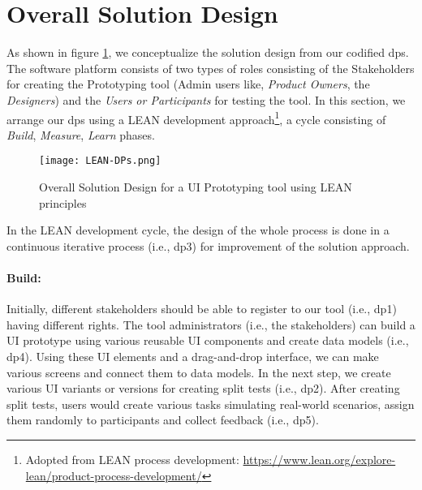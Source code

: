 
\clearpage
\section{Overall Solution Design}
\label{design:section:solutiondesign}
As shown in figure \ref{fig:design:lean}, we conceptualize the solution design from our codified \ac{dp}s.
The software platform consists of two types of roles consisting of the Stakeholders for creating the Prototyping tool (Admin users like, \textit{Product Owners}, the \textit{Designers}) and the \textit{Users or Participants} for testing the tool.
In this section, we arrange our \ac{dp}s using a LEAN development approach\footnote{Adopted from LEAN process development: \url{https://www.lean.org/explore-lean/product-process-development/}}, a cycle consisting of \textit{Build}, \textit{Measure}, \textit{Learn} phases.

\begin{figure}[htbp!]
  \centering    
  \texttt{[image: LEAN-DPs.png]}
  \caption[Solution Concept]{Overall Solution Design for a UI Prototyping tool using LEAN principles}
  \label{fig:design:lean}
\end{figure}

In the LEAN development cycle, the design of the whole process is done in a continuous iterative process (i.e., \ac{dp}3) for improvement of the solution approach.
\paragraph{Build:}
\label{design:paragraph:build}
Initially, different stakeholders should be able to register to our tool (i.e., \ac{dp}1) having different rights. 
The tool administrators (i.e., the stakeholders) can build a UI prototype using various reusable UI components and create data models (i.e., \ac{dp}4). Using these UI elements and a drag-and-drop interface, we can make various screens and connect them to data models.
In the next step, we create various UI variants or versions for creating split tests (i.e., \ac{dp}2).
After creating split tests, users would create various tasks simulating real-world scenarios, assign them randomly to participants and collect feedback (i.e., \ac{dp}5).
